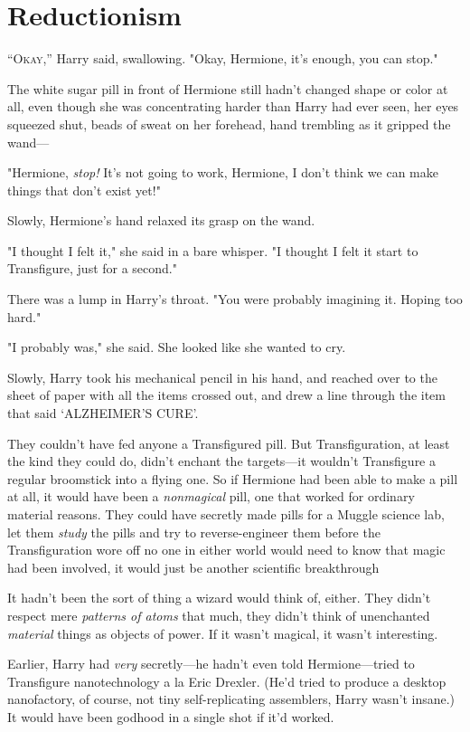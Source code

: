 \chapter{Reductionism}

\lettrine{“O}{kay,''} Harry said, swallowing. "Okay, Hermione, it's enough, you can stop."

The white sugar pill in front of Hermione still hadn't changed shape or color
at all, even though she was concentrating harder than Harry had ever seen, her
eyes squeezed shut, beads of sweat on her forehead, hand trembling as it
gripped the wand\mbox{---}

"Hermione, \emph{stop!} It's not going to work, Hermione, I don't think we can
make things that don't exist yet!"

Slowly, Hermione's hand relaxed its grasp on the wand.

"I thought I felt it," she said in a bare whisper. "I thought I felt it start
to Transfigure, just for a second."

There was a lump in Harry's throat. "You were probably imagining it. Hoping too
hard."

"I probably was," she said. She looked like she wanted to cry.

Slowly, Harry took his mechanical pencil in his hand, and reached over to the
sheet of paper with all the items crossed out, and drew a line through the item
that said `ALZHEIMER'S CURE'.

They couldn't have fed anyone a Transfigured pill. But Transfiguration, at
least the kind they could do, didn't enchant the targets---it wouldn't
Transfigure a regular broomstick into a flying one. So if Hermione had been
able to make a pill at all, it would have been a \emph{nonmagical} pill, one
that worked for ordinary material reasons. They could have secretly made pills
for a Muggle science lab, let them \emph{study} the pills and try to
reverse-engineer them before the Transfiguration wore off{\el} no one in
either world would need to know that magic had been involved, it would just be
another scientific breakthrough{\el}

It hadn't been the sort of thing a wizard would think of, either. They didn't
respect mere \emph{patterns of atoms} that much, they didn't think of
unenchanted \emph{material} things as objects of power. If it wasn't magical,
it wasn't interesting.

Earlier, Harry had \emph{very} secretly---he hadn't even told Hermione---tried
to Transfigure nanotechnology a la Eric Drexler. (He'd tried to produce a
desktop nanofactory, of course, not tiny self-replicating assemblers, Harry
wasn't insane.) It would have been godhood in a single shot if it'd worked.

